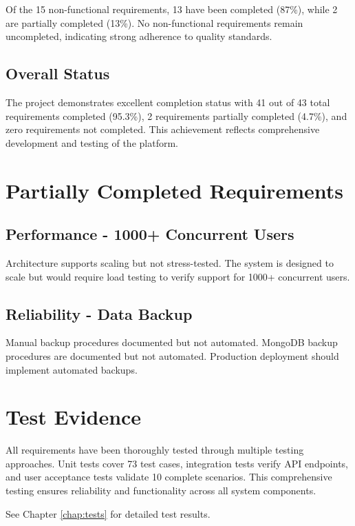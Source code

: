 \documentclass[12pt,a4paper]{report}
\begin{document}
Of the 15 non-functional requirements, 13 have been completed (87\%), while 2 are partially completed (13\%). No non-functional requirements remain uncompleted, indicating strong adherence to quality standards.

\subsection{Overall Status}

The project demonstrates excellent completion status with 41 out of 43 total requirements completed (95.3\%), 2 requirements partially completed (4.7\%), and zero requirements not completed. This achievement reflects comprehensive development and testing of the platform.

\section{Partially Completed Requirements}

\subsection{Performance - 1000+ Concurrent Users}

Architecture supports scaling but not stress-tested. The system is designed to scale but would require load testing to verify support for 1000+ concurrent users.

\subsection{Reliability - Data Backup}

Manual backup procedures documented but not automated. MongoDB backup procedures are documented but not automated. Production deployment should implement automated backups.

\section{Test Evidence}

All requirements have been thoroughly tested through multiple testing approaches. Unit tests cover 73 test cases, integration tests verify API endpoints, and user acceptance tests validate 10 complete scenarios. This comprehensive testing ensures reliability and functionality across all system components.

See Chapter \ref{chap:tests} for detailed test results.
\end{document}
